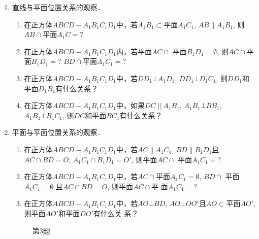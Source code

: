 \begin{enumerate}
\item 直线与平面位置关系的观察．
\begin{enumerate}
  \item 在正方体$ABCD-A_1B_1C_1D_1$中，若$A_1B_1\subset$平面$A_1C_1$, 
  $AB\parallel A_1B_1$, 则$AB\cap $平面$A_1C=?$
  \item 在正方体$ABCD-A_1B_1C_1D_1$内，若平面$AC\cap $
  平面$B_1D_1=\emptyset$, 则$AC\cap $平面$B_1D_1=?$ $BD\cap $平面$A_1C_1=?$
  \item 在正方体$ABCD-A_1B_1C_1D_1$中，若$DD_1\bot A_1D_1$, 
  $DD_1\bot D_1C_1$, 则$DD_1$和平面$D_1B_1$有什么关系？
  \item 在正方体$ABCD-A_1B_1C_1D_1$中，如果$DC\parallel A_1B_1$, 
  $A_1B_1\bot BB_1$, $A_1B_1\bot B_1C_1$, 则$DC$和平面$BC_1$有什么关系？
\end{enumerate}

\item 平面与平面位置关系的观察．
\begin{enumerate}
  \item 在正方体$ABCD-A_1B_1C_1D_1$中，若$AC\parallel A_1C_1$, 
  $BD\parallel B_1D_1$且$AC\cap BD=O$, $A_1C_1\cap B_1D_1=O'$, 则平面$AC\cap$
  平面$A_1C_1=?$
  \item 在正方体$ABCD-A_1B_1C_1D_1$中，若$AC\cap$平面$A_1C_1
  =\emptyset$, $BD\cap $ 平面$A_1C_1=\emptyset$ 且$AC\cap BD=O$, 则平面$AC\cap $平
  面$A_1C_1=?$
  \item 在正方体$ABCD-A_1B_1C_1D_1$中，若$AO\bot BD$, $AO\bot 
  OO'$且$AO\subset $平面$AO'$, 则平面$AO'$和平面$DO'$有什么关
  系？
\end{enumerate}

\begin{figure}[htp]
  \centering
  \caption*{第3题}
\end{figure}

\end{enumerate}

